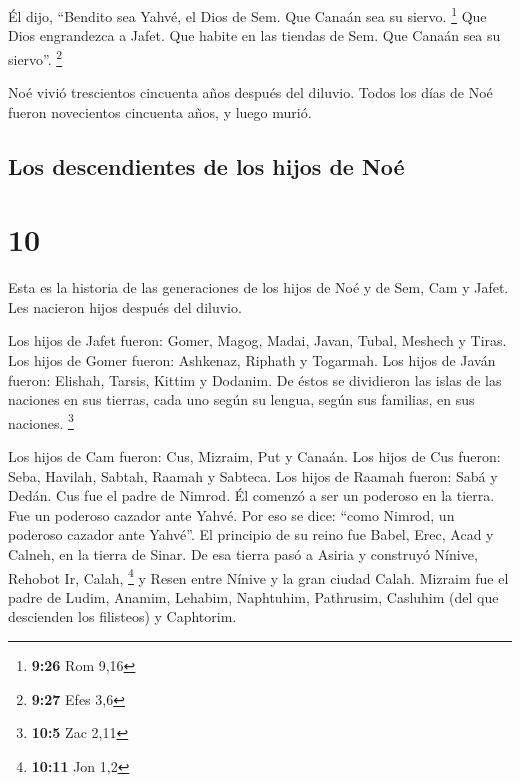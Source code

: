  Él dijo, ``Bendito sea Yahvé, el Dios de Sem. Que Canaán
sea su siervo. \footnote{\textbf{9:26} Rom 9,16}  Que
Dios engrandezca a Jafet. Que habite en las tiendas de Sem. Que Canaán
sea su siervo''. \footnote{\textbf{9:27} Efes 3,6}

 Noé vivió trescientos cincuenta años después del
diluvio.  Todos los días de Noé fueron novecientos
cincuenta años, y luego murió.

\hypertarget{los-descendientes-de-los-hijos-de-nouxe9}{%
\subsection{Los descendientes de los hijos de
Noé}\label{los-descendientes-de-los-hijos-de-nouxe9}}

\hypertarget{section-9}{%
\section{10}\label{section-9}}

 Esta es la historia de las generaciones de los hijos de
Noé y de Sem, Cam y Jafet. Les nacieron hijos después del diluvio.

 Los hijos de Jafet fueron: Gomer, Magog, Madai, Javan,
Tubal, Meshech y Tiras.  Los hijos de Gomer fueron:
Ashkenaz, Riphath y Togarmah.  Los hijos de Javán fueron:
Elishah, Tarsis, Kittim y Dodanim.  De éstos se dividieron
las islas de las naciones en sus tierras, cada uno según su lengua,
según sus familias, en sus naciones. \footnote{\textbf{10:5} Zac 2,11}

 Los hijos de Cam fueron: Cus, Mizraim, Put y Canaán.
 Los hijos de Cus fueron: Seba, Havilah, Sabtah, Raamah y
Sabteca. Los hijos de Raamah fueron: Sabá y Dedán.  Cus
fue el padre de Nimrod. Él comenzó a ser un poderoso en la tierra.
 Fue un poderoso cazador ante Yahvé. Por eso se dice:
``como Nimrod, un poderoso cazador ante Yahvé''.  El
principio de su reino fue Babel, Erec, Acad y Calneh, en la tierra de
Sinar.  De esa tierra pasó a Asiria y construyó Nínive,
Rehobot Ir, Calah, \footnote{\textbf{10:11} Jon 1,2}  y
Resen entre Nínive y la gran ciudad Calah.  Mizraim fue
el padre de Ludim, Anamim, Lehabim, Naphtuhim, 
Pathrusim, Casluhim (del que descienden los filisteos) y Caphtorim.

